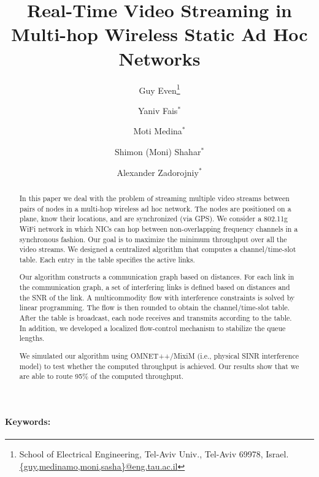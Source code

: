 \documentclass[12pt]{article}
\newenvironment{proof sketch}[1]{\noindent {\emph{Proof sketch of #1:}}}{\hfill \qed}
\begin{document}
\title{Real-Time Video Streaming in Multi-hop Wireless Static Ad Hoc Networks}

\ifnum{}
\author{%
Guy Even\thanks{School of Electrical Engineering,
Tel-Aviv Univ., Tel-Aviv 69978, Israel.
\protect\url{{guy,medinamo,moni,sasha}@eng.tau.ac.il}}
\and
Yaniv Fais$^*$
\and
Moti Medina$^*$
%
\and Shimon (Moni) Shahar$^*$
\and Alexander Zadorojniy$^*$ }
\fi
\date{}

\maketitle



\begin{abstract}
  In this paper we deal with the problem of streaming multiple video
  streams between pairs of nodes in a multi-hop wireless ad hoc
  network.  The nodes are positioned on a plane, know their locations,
  and are synchronized (via GPS). We consider a 802.11g WiFi network
  in which NICs can hop between non-overlapping frequency channels in
  a synchronous fashion. Our goal is to maximize the minimum
  throughput over all the video streams. We designed a centralized
  algorithm that computes a channel/time-slot table.  Each entry in
  the table specifies the active links.

  Our algorithm constructs a communication graph based on distances.
  For each link in the communication graph, a set of interfering links
  is defined based on distances and the SNR of the link.  A
  multicommodity flow with interference constraints is solved by
  linear programming. The flow is then rounded to obtain the
  channel/time-slot table. After the table is broadcast, each node
  receives and transmits according to the table. In addition, we developed a localized
  flow-control mechanism to stabilize the queue lengths.

  We simulated our algorithm using OMNET++/MixiM (i.e., physical SINR
  interference model) to test whether the computed throughput is
  achieved. Our results show that we are able to route 95\% of the
  computed throughput.
\end{abstract}


\paragraph{
Keywords:}
\end{document}
